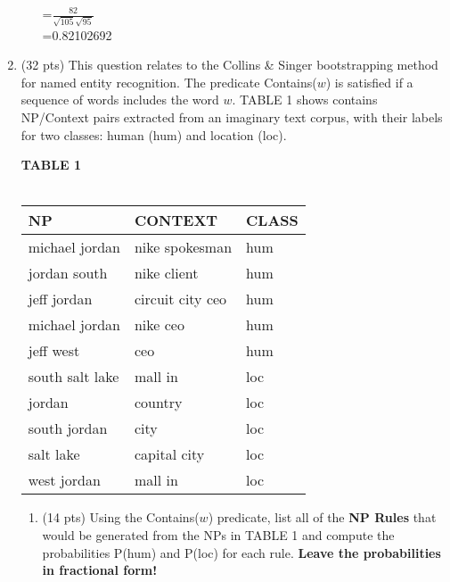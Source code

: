 \documentclass[11pt]{article}
\begin{document}
\begin{enumerate}
\begin{enumerate}
=$\frac{82}{\sqrt{105} \sqrt{95}}$\\

=0.82102692\\

\end{enumerate}


\newpage
\item (32 pts) This question relates to the Collins \& Singer
  bootstrapping method for named entity recognition.  The predicate
  Contains($w$) is satisfied if a sequence of words includes the word
  $w$. TABLE 1 shows contains NP/Context pairs extracted
  from an imaginary text corpus, with their labels for two classes:
  {\sc human (hum)} and {\sc location (loc)}. 

\begin{center}
\textbf{TABLE 1} \\
~ \\
\begin{tabular}{|lll|} \hline
\textbf{NP}  & \textbf{CONTEXT} & \textbf{CLASS} \\ \hline
michael jordan & nike spokesman & {\sc hum} \\
jordan south & nike client & {\sc hum} \\
jeff jordan & circuit city ceo  & {\sc hum} \\ 
michael jordan & nike ceo  & {\sc hum} \\ 
jeff west & ceo  & {\sc hum} \\ 
south salt lake & mall in & {\sc loc} \\
jordan & country & {\sc loc} \\
south jordan & city & {\sc loc} \\ 
salt lake & capital city & {\sc loc} \\
west jordan & mall in & {\sc loc} \\ 
\hline
\end{tabular}
\end{center}

\begin{enumerate}
\item (14 pts) Using the Contains($w$) predicate, list all of the 
{\bf NP Rules} that would be generated from the NPs in TABLE
  1 and compute the probabilities P({\sc hum}) and P({\sc loc}) for each
  rule. \textbf{Leave the probabilities in   fractional form!}  \\ 


\end{enumerate}
\end{enumerate}
\end{document}
